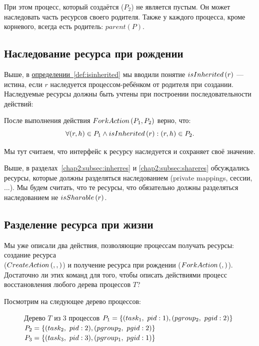 При этом процесс, который создаётся ($P_2$) не является пустым. Он может наследовать часть ресурсов своего родителя. Также у каждого процесса, кроме корневого, всегда есть родитель: $parent(P)$.

\subsection{Наследование ресурса при рождении}

Выше, в \hyperref[def:isinherited]{определении~\ref{def:isinherited}} мы вводили понятие $isInherited\left( r \right)$ --- истина, если $r$ наследуется процессом-ребёнком от родителя при создании. Наследуемые ресурсы должны быть учтены при построении последовательности действий:

После выполнения действия $ForkAction\left( P_1, P_2 \right)$ верно, что:
\begin{equation}
\label{eq:inherAtFork} 
	\forall (r, h) \in P_1 \land isInherited\left( r \right): (r, h) \in P_2.
\end{equation}

\begin{note}
Мы тут считаем, что интерфейс к ресурсу наследуется и сохраняет своё значение.
\end{note}

Выше, в разделах~\ref{chap2:subsec:inherres} и \ref{chap2:subsec:shareres} обсуждались ресурсы, которые должны разделяться наследованием (private mappings, сессии, ...). Мы будем считать, что те ресурсы, что обязательно должны разделяться наследованием не $isSharable\left( r \right)$.

\subsection{Разделение ресурса при жизни}

Мы уже описали два действия, позволяющие процессам получать ресурсы: создание ресурса \\($CreateAction\left( , ,  \right)$) и получение ресурса при рождении ($ForkAction\left( ,  \right)$). Достаточно ли этих команд для того, чтобы описать действиями процесс восстановления любого дерева процессов $T$?

Посмотрим на следующее дерево процессов:

\begin{figure}[ht!]
\centering
{}
\begin{caption}{Дерево $T$ из 3 процессов}
$P_1 = \xbrace{(task_1,\ pid: 1), (pgroup_2,\ pgid: 2)}$\\
$P_2 = \xbrace{(task_2,\ pid: 2), (pgroup_2,\ pgid: 2)}$\\
$P_3 = \xbrace{(task_3,\ pid: 3), (pgroup_1,\ pgid: 1)}$
\end{caption}
\end{figure}

